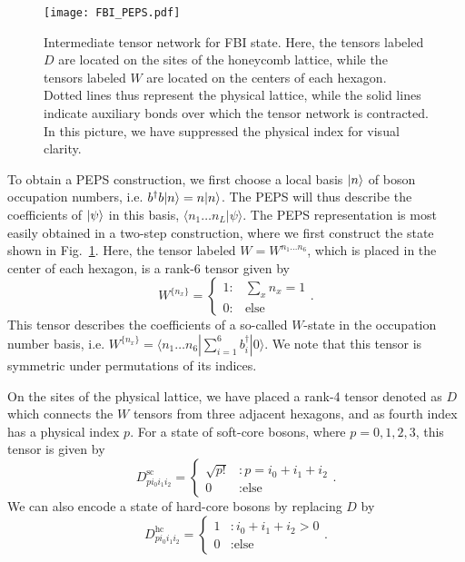 \begin{figure}
	\centering
	\texttt{[image: FBI\_PEPS.pdf]}
	\caption{
	Intermediate tensor network for FBI state. Here, the tensors labeled $D$ are located on the
	sites of the honeycomb lattice, while the tensors labeled $W$ are located on the centers of each hexagon.
	Dotted lines thus represent the physical lattice, while the solid lines indicate auxiliary bonds over which the tensor network
	is contracted. In this picture, we have suppressed the physical index for visual clarity.}
	\label{fig:FBI_PEPS}
\end{figure}

To obtain a PEPS construction, we first choose a local basis $\vert n \rangle$ of boson occupation numbers, i.e. $b^\dagger b \vert n \rangle = n \vert n \rangle$. The
PEPS will thus describe the coefficients of $\vert \psi \rangle$ in this basis, $\langle n_1 \ldots n_L | \psi \rangle$.
The PEPS representation is most easily obtained in a two-step construction, where we first construct the state shown in Fig.~\ref{fig:FBI_PEPS}.
Here, the tensor labeled $W=W^{n_1 \ldots n_6}$, which is placed in the center of each hexagon, is a rank-6 tensor given by
\begin{equation}
W^{\{n_x\}}  = \left\{ \begin{array}{lr}
													1  : & \sum\limits_x n_x = 1 \\
													0  : & \text{else}
													\end{array} \right. .
\end{equation}
This tensor describes the coefficients of a so-called $W$-state in the occupation number basis, i.e. $W^{\lbrace n_x\rbrace }= \langle n_1 \ldots n_6 | \sum_{i=1}^6 b_i^\dagger |0\rangle$. We note that this tensor is symmetric under permutations of its indices.

On the sites of the physical lattice, we have placed a rank-4 tensor denoted as $D$ which connects the $W$ tensors from three adjacent hexagons,
and as fourth index has a physical index $p$. For a state of soft-core bosons, where $p=0,1,2,3$, this tensor is given by
\begin{equation} \label{eqn:D}
D^\mathrm{sc}_{p i_0 i_1 i_2}  = \left\{ \begin{array}{ll}
													\sqrt{p!}  &: p =i_0+i_1+i_2  \\
													0  &:  \text{else}
													\end{array}
											\right. .
\end{equation}
We can also encode a state of hard-core bosons by replacing $D$ by
\begin{equation}
D^\mathrm{hc}_{p i_0 i_1 i_2}  = \left\{ \begin{array}{ll}
													1  &: i_0+i_1+i_2 > 0  \\
													0  &:  \text{else}
													\end{array}
											\right. .
\end{equation}

